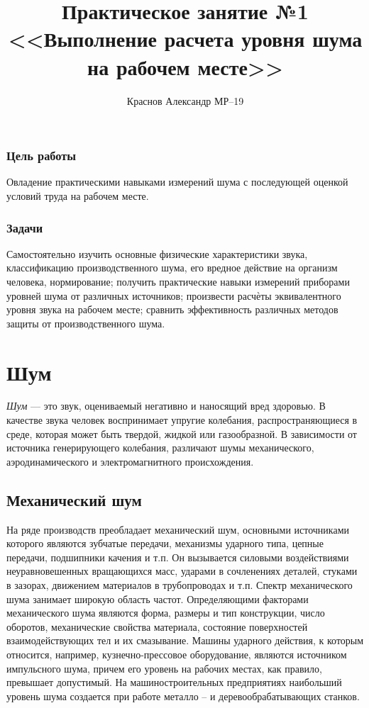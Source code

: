 \documentclass[a5paper, 12pt, twoside]{article}
\title{Практическое занятие №1\\<<Выполнение расчета уровня шума на рабочем месте>>}
\author{Краснов Александр МР--19}
\begin{document}
\maketitle
\tableofcontents

\subsubsection*{Цель работы}
Овладение практическими навыками измерений шума с пос\-ле\-ду\-ю\-щей оценкой условий труда на рабочем месте.

\subsubsection*{Задачи}
Самостоятельно изучить основные физические ха\-рак\-те\-рис\-ти\-ки звука, классификацию производственного шума, его вредное действие на организм человека, нормирование; получить практические навыки измерений приборами уровней шума от различных источников; произвести расчѐты эквивалентного уровня звука на рабочем месте; сравнить эффективность различных методов защиты от про\-из\-вод\-ствен\-но\-го шума.

\section{Шум}
{\itshape Шум} --- это звук, оцениваемый негативно и наносящий\- вред здоровью. 
В качестве звука человек воспринимает упругие колебания, распространяющиеся в среде, которая может быть твердой, жидкой или газообразной. В зависимости от источника генерирующего колебания, различают шумы механического, аэродинамического и электромагнитного происхождения. 

\subsection{Механический шум}
На ряде производств преобладает механический шум, основными источниками которого являются зубчатые передачи, механизмы ударного типа, цепные передачи, подшипники качения и т.п. Он вызывается силовыми воздействиями неуравновешенных вращающихся масс, ударами в сочленениях деталей, стуками в зазорах, движением материалов в трубопроводах и т.п. Спектр механического шума занимает широкую область частот. Определяющими факторами механического шума являются форма, размеры и тип конструкции, число оборотов, механические свойства материала, состояние поверхностей взаимодействующих тел и их смазывание. Машины ударного действия, к которым относится, например, кузнечно-прессовое оборудование, являются источником импульсного шума, причем его уровень на рабочих местах, как правило, превышает допустимый. На машиностроительных предприятиях наибольший уровень шума создается при работе металло -- и деревообрабатывающих станков. 
\end{document}
